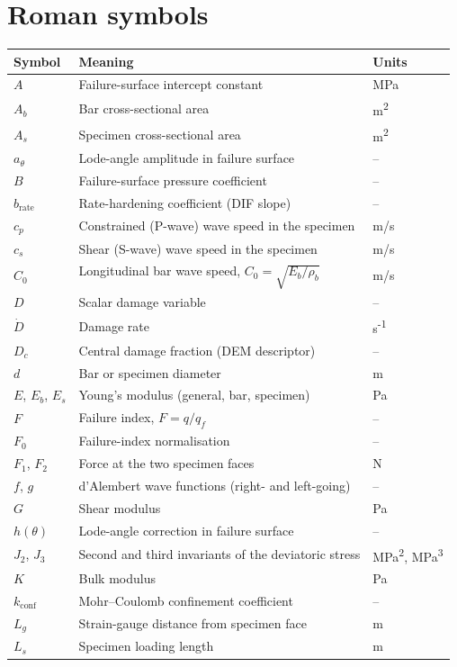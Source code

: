 \documentclass[11pt,a4paper,openany]{book}
\theoremstyle{handbook}
\newcommand{\Cz}{C_0}
\newcommand{\Ab}{A_b}
\newcommand{\As}{A_s}
\newcommand{\Ls}{L_s}
\begin{document}
\section*{Roman symbols}
\begingroup
\setlength{\parskip}{0pt}
\begin{tabular}{@{}p{3.2cm}p{10cm}p{2cm}@{}}
\toprule
\textbf{Symbol} & \textbf{Meaning} & \textbf{Units} \\
\midrule
$A$ & Failure-surface intercept constant & MPa \\
$\Ab$ & Bar cross-sectional area & m\textsuperscript{2} \\
$\As$ & Specimen cross-sectional area & m\textsuperscript{2} \\
$a_\theta$ & Lode-angle amplitude in failure surface & -- \\
$B$ & Failure-surface pressure coefficient & -- \\
$b_{\text{rate}}$ & Rate-hardening coefficient (DIF slope) & -- \\
$c_p$ & Constrained (P-wave) wave speed in the specimen & m/s \\
$c_s$ & Shear (S-wave) wave speed in the specimen & m/s \\
$\Cz$ & Longitudinal bar wave speed, $\Cz=\sqrt{E_b/\rho_b}$ & m/s \\
$D$ & Scalar damage variable & -- \\
$\dot D$ & Damage rate & s\textsuperscript{-1} \\
$D_c$ & Central damage fraction (DEM descriptor) & -- \\
$d$ & Bar or specimen diameter & m \\
$E$, $E_b$, $E_s$ & Young's modulus (general, bar, specimen) & Pa \\
$F$ & Failure index, $F=q/q_f$ & -- \\
$F_0$ & Failure-index normalisation & -- \\
$F_1$, $F_2$ & Force at the two specimen faces & N \\
$f$, $g$ & d'Alembert wave functions (right- and left-going) & -- \\
$G$ & Shear modulus & Pa \\
$h(\theta)$ & Lode-angle correction in failure surface & -- \\
$J_2$, $J_3$ & Second and third invariants of the deviatoric stress & MPa\textsuperscript{2}, MPa\textsuperscript{3} \\
$K$ & Bulk modulus & Pa \\
$k_{\text{conf}}$ & Mohr--Coulomb confinement coefficient & -- \\
$L_g$ & Strain-gauge distance from specimen face & m \\
$\Ls$ & Specimen loading length & m \\
\bottomrule
\end{tabular}
\endgroup
\end{document}
